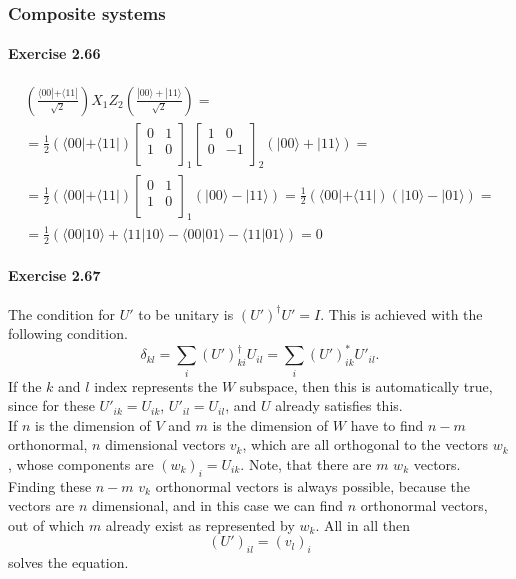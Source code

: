 \documentclass[a4paper,12pt]{article}
\newcommand{\exercise}[1]{\paragraph{Exercise #1}}
\newcommand{\la}{\langle}
\newcommand{\ra}{\rangle}
\begin{document}
    \subsubsection{Composite systems}

    \exercise{2.66}
    \begin{gather}
        \nonumber
        \left(\frac{ \la 00 | + \la 11 | }{\sqrt{2}} \right) X_1 Z_2 \left(\frac{ |00\ra + |11\ra }{\sqrt{2}} \right) =\\
        \nonumber
        = \frac{1}{2}
        (\la 00 | + \la 11 |)
        \begin{bmatrix}
            0 & 1\\
            1 & 0\\
        \end{bmatrix}_1
        \begin{bmatrix}
            1 & 0\\
            0 & -1\\
        \end{bmatrix}_2
        (|00\ra + |11\ra) =\\
        \nonumber
        = \frac{1}{2}
        (\la 00 | + \la 11 |)
        \begin{bmatrix}
            0 & 1\\
            1 & 0\\
        \end{bmatrix}_1
        (|00\ra - |11\ra) =
        \frac{1}{2}
        (\la 00 | + \la 11 |)
        (|10\ra - |01\ra) =\\
        = \frac{1}{2}
        (\la 00|10 \ra + \la 11 | 10 \ra -
        \la 00 | 01 \ra - \la 11 | 01 \ra ) = 0
    \end{gather}

    \exercise{2.67} The condition for $U'$ to be unitary is $(U')^\dagger U' = I$. This is achieved with the following condition.
    \begin{equation}
        \delta_{kl} = \sum_i (U')^\dagger_{ki} U_{il} = \sum_i (U')_{ik}^* U'_{il} \textrm{.}
    \end{equation}
    If the $k$ and $l$ index represents the $W$ subspace, then this is automatically true, since for these $U'_{ik} = U_{ik}$, $U'_{il} = U_{il}$, and $U$ already satisfies this.\\
    \indent
    If $n$ is the dimension of $V$ and $m$ is the dimension of $W$ have to find $n - m$ orthonormal, $n$ dimensional vectors $v_k$, which are all orthogonal to the vectors $w_k$, whose components are $(w_k)_i = U_{ik}$. Note, that there are $m$ $w_k$ vectors. Finding these $n - m$ $v_k$ orthonormal vectors is always possible, because the vectors are $n$ dimensional, and in this case we can find $n$ orthonormal vectors, out of which $m$ already exist as represented by $w_k$. All in all then
    \begin{equation}
        (U')_{il} = (v_l)_i
    \end{equation}
    solves the equation.
\end{document}
